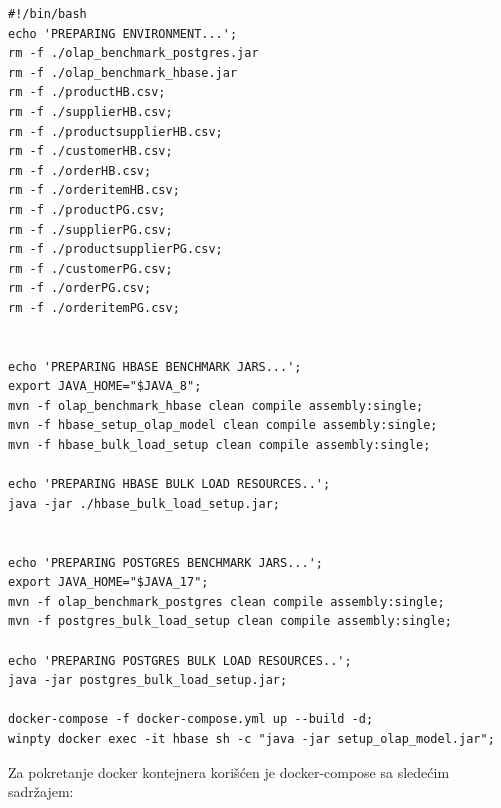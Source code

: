 \documentclass[12pt,oneside]{memoir}
\begin{document}
\begin{lstlisting}[title={prepareEnv.sh},captionpos=t]
#!/bin/bash
echo 'PREPARING ENVIRONMENT...';
rm -f ./olap_benchmark_postgres.jar
rm -f ./olap_benchmark_hbase.jar
rm -f ./productHB.csv;
rm -f ./supplierHB.csv;
rm -f ./productsupplierHB.csv;
rm -f ./customerHB.csv;
rm -f ./orderHB.csv;
rm -f ./orderitemHB.csv;
rm -f ./productPG.csv;
rm -f ./supplierPG.csv;
rm -f ./productsupplierPG.csv;
rm -f ./customerPG.csv;
rm -f ./orderPG.csv;
rm -f ./orderitemPG.csv;


echo 'PREPARING HBASE BENCHMARK JARS...';
export JAVA_HOME="$JAVA_8";
mvn -f olap_benchmark_hbase clean compile assembly:single;
mvn -f hbase_setup_olap_model clean compile assembly:single;
mvn -f hbase_bulk_load_setup clean compile assembly:single;

echo 'PREPARING HBASE BULK LOAD RESOURCES..';
java -jar ./hbase_bulk_load_setup.jar;


echo 'PREPARING POSTGRES BENCHMARK JARS...';
export JAVA_HOME="$JAVA_17";
mvn -f olap_benchmark_postgres clean compile assembly:single;
mvn -f postgres_bulk_load_setup clean compile assembly:single;

echo 'PREPARING POSTGRES BULK LOAD RESOURCES..';
java -jar postgres_bulk_load_setup.jar;

docker-compose -f docker-compose.yml up --build -d;
winpty docker exec -it hbase sh -c "java -jar setup_olap_model.jar";

\end{lstlisting}


\pagebreak

 Za pokretanje docker kontejnera korišćen je docker-compose sa sledećim sadržajem:

\end{document}
